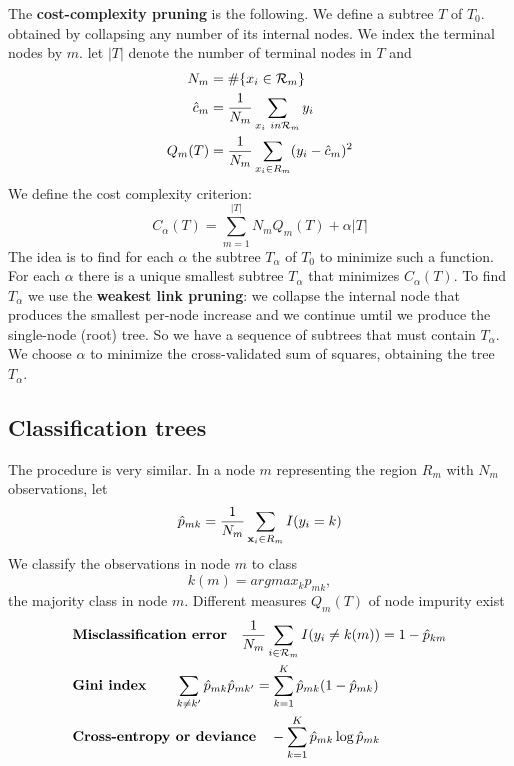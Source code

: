 The \textbf{cost-complexity pruning} is the following. We define a subtree $T$ of $T_0$. obtained by collapsing any number of its internal nodes. We index the terminal nodes by $m$. let $|T|$ denote the number of terminal nodes in $T$ and 
\begin{equation}
\begin{aligned}
N_m &= \#\{x_i \in \CMcal{R}_m\}\\
\hat{c}_m &= \frac{1}{N_m} \sum_{x_i \ in \CMcal{R}_m} y_i\\
Q_m(T) &= \frac{1}{N_m} \sum_{x_i \in R_m}(y_i - \hat{c}_m)^2
\end{aligned}
\end{equation} 
We define the cost complexity criterion:
\begin{equation}
C_\alpha (T) = \sum_{m=1}^{|T|} N_m Q_m(T) + \alpha |T|
\end{equation}
The idea is to find for each $\alpha$ the subtree $T_\alpha$ of $T_0$ to minimize such a function.
For each $\alpha$ there is a unique smallest subtree $T_\alpha$ that minimizes $C_\alpha(T)$. To find $T_\alpha$ we use the \textbf{weakest link pruning}: we collapse the internal node that produces the smallest per-node increase and we continue umtil we produce the single-node (root) tree. So we have a sequence of subtrees that must contain $T_\alpha$. We choose $\alpha$ to minimize the cross-validated sum of squares, obtaining the tree $T_\alpha$.

\subsection{Classification trees}
The procedure is very similar. In a node $m$ representing the region $R_m$ with $N_m$ observations, let 
\begin{equation}
\hat{p}_{mk} = \frac{1}{N_m}\sum_{\mathbf{x}_i\in R_m} I(y_i=k)
\end{equation}
We classify the observations in node $m$ to class
\begin{equation}
k(m) =argmax_k \hat{p}_{mk},
\end{equation}
the majority class in node $m$. Different measures $Q_m(T)$ of node impurity exist
\begin{equation}
\begin{aligned}
&\textbf{Misclassification error} \quad \frac{1}{N_m} \sum_{i\in \CMcal{R}_m} I(y_i \ne k(m))=1-\hat{p}_{km}\\
&\textbf{Gini index} \quad\quad \sum_{k\ne k'} \hat{p}_{mk}\hat{p}_{mk'} = \sum_{k=1}^K \hat{p}_{mk}(1- \hat{p}_{mk})\\
&\textbf{Cross-entropy or deviance} \quad -\sum_{k=1}^K \hat{p}_{mk}\log \hat{p}_{mk}
\end{aligned}
\end{equation}

